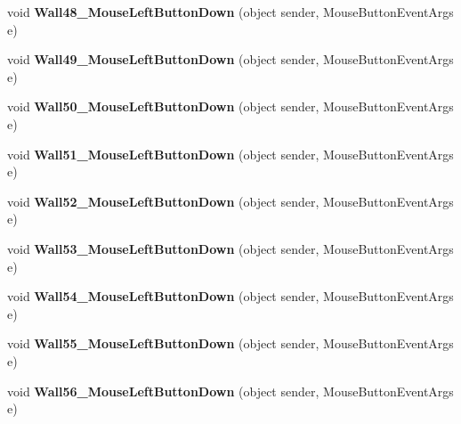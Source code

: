 \begin{DoxyCompactItemize}
void {\bfseries Wall48\+\_\+\+Mouse\+Left\+Button\+Down} (object sender, Mouse\+Button\+Event\+Args e)
\item 
\mbox{\label{class_r6_1_1_border_window_ac89ec90830f2d829de42865d7b82c318}} 
void {\bfseries Wall49\+\_\+\+Mouse\+Left\+Button\+Down} (object sender, Mouse\+Button\+Event\+Args e)
\item 
\mbox{\label{class_r6_1_1_border_window_ab423c10e2c6b35bb0ff2f06a0884881c}} 
void {\bfseries Wall50\+\_\+\+Mouse\+Left\+Button\+Down} (object sender, Mouse\+Button\+Event\+Args e)
\item 
\mbox{\label{class_r6_1_1_border_window_aeb530edbe49726551fd82d4e42c96f26}} 
void {\bfseries Wall51\+\_\+\+Mouse\+Left\+Button\+Down} (object sender, Mouse\+Button\+Event\+Args e)
\item 
\mbox{\label{class_r6_1_1_border_window_ae41b4459bed265f4758d391dafa45b31}} 
void {\bfseries Wall52\+\_\+\+Mouse\+Left\+Button\+Down} (object sender, Mouse\+Button\+Event\+Args e)
\item 
\mbox{\label{class_r6_1_1_border_window_afc5244aab0b6d989d3ecee7f89092e54}} 
void {\bfseries Wall53\+\_\+\+Mouse\+Left\+Button\+Down} (object sender, Mouse\+Button\+Event\+Args e)
\item 
\mbox{\label{class_r6_1_1_border_window_a36404fa0e2cede070ac95c0d42104041}} 
void {\bfseries Wall54\+\_\+\+Mouse\+Left\+Button\+Down} (object sender, Mouse\+Button\+Event\+Args e)
\item 
\mbox{\label{class_r6_1_1_border_window_ae9c2cd38cdbf4fddb9a15e426c2ab767}} 
void {\bfseries Wall55\+\_\+\+Mouse\+Left\+Button\+Down} (object sender, Mouse\+Button\+Event\+Args e)
\item 
\mbox{\label{class_r6_1_1_border_window_abe7ee3a7fe62beca86c69212ca5ac066}} 
void {\bfseries Wall56\+\_\+\+Mouse\+Left\+Button\+Down} (object sender, Mouse\+Button\+Event\+Args e)
\item 
\mbox{\label{class_r6_1_1_border_window_a58df3ea6dd3e281d89db94c63e1407f7}} 

\end{DoxyCompactItemize}
